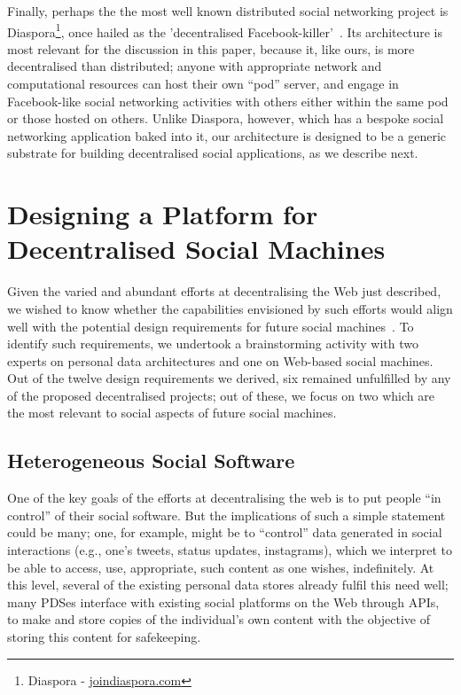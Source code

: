 \documentclass{sig-alternate}
\begin{document}
Finally, perhaps the the most well known distributed social networking project is Diaspora\footnote{Diaspora - \url{joindiaspora.com}}, once hailed as the 'decentralised Facebook-killer'~\cite{verge}.  Its architecture is most relevant for the discussion in this paper, because it, like ours, is more decentralised than distributed; anyone with appropriate network and computational resources can host their own ``pod'' server, and engage in Facebook-like social networking activities with others either within the same pod or those hosted on others.  Unlike Diaspora, however, which has a bespoke social networking application baked into it, our architecture is designed to be a generic substrate for building decentralised social applications, as we describe next.

\section{Designing a Platform for Decentralised Social Machines}

Given the varied and abundant efforts at decentralising the Web just described, we wished to know whether the capabilities envisioned by such efforts would align well with the potential design requirements for future social machines~\cite{hendler2010semantic}.  To identify such requirements, we undertook a brainstorming activity with two experts on personal data architectures and one on Web-based social machines.  Out of the twelve design requirements we derived, six remained unfulfilled by any of the proposed decentralised projects; out of these, we focus on two which are the most relevant to social aspects of future social machines.

\subsection{Heterogeneous Social Software}

One of the key goals of the efforts at decentralising the web is to put people ``in control'' of their social software. But the implications of such a simple statement could be many; one, for example, might be to ``control'' data generated in social interactions (e.g., one's tweets, status updates, instagrams), which we interpret to be able to access, use, appropriate, such content as one wishes, indefinitely.  At this level, several of the existing personal data stores already fulfil this need well; many PDSes interface with existing social platforms on the Web through APIs, to make and store copies of the individual's own content with the objective of storing this content for safekeeping.
\end{document}
